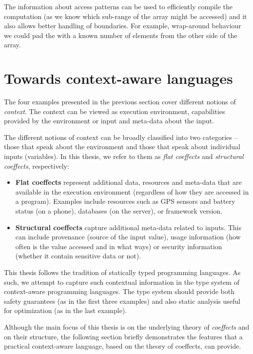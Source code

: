 The information about access patterns can be used to efficiently compile the computation
(as we know which sub-range of the array might be accessed) and it also allows better handling
of boundaries. For example, wrap-around behaviour we could pad the  with a known
number of elements from the other side of the array.


\section{Towards context-aware languages}

The four examples presented in the previous section cover different notions of \emph{context}.
The context can be viewed as execution environment, capabilities provided by the environment 
or input and meta-data about the input.

The different notions of context can be broadly classified into two categories -- those that
speak about the environment and those that speak about individual inputs (variables). In this
thesis, we refer to them as \emph{flat coeffects} and \emph{structural coeffects}, respectively:

\begin{itemize}
\item \textbf{Flat coeffects} represent additional data, resources and meta-data that are 
   available in the execution environment (regardless of how they are accessed in a program).
   Examples include resources such as GPS sensors and battery status (on a phone), databases 
   (on the server), or framework version.

\item \textbf{Structural coeffects} capture additional meta-data related to inputs. This can include
   provenance (source of the input value), usage information (how often is the value
   accessed and in what ways) or security information (whether it contain sensitive data or not). 
\end{itemize}
%
This thesis follows the tradition of statically typed programming languages. As such, we
attempt to capture such contextual information in the type system of context-aware programming
languages. The type system should provide both safety guarantees (as in the first three examples)
and also static analysis useful for optimization (as in the last example).

Although the main focus of this thesis is on the underlying theory of \emph{coeffects} and on
their structure, the following section briefly demonstrates the features that a practical
context-aware language, based on the theory of coeffects, can provide. 

